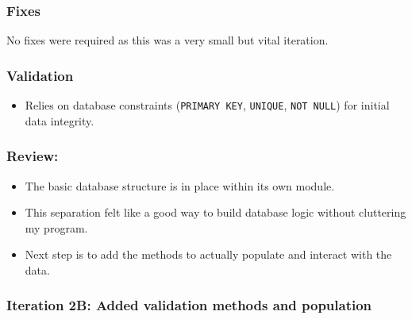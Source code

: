 \subsubsection{Fixes}
No fixes were required as this was a very small but vital iteration.

\subsubsection{Validation}
\begin{itemize}
	\item Relies on database constraints (\verb|PRIMARY KEY|, \verb|UNIQUE|, \verb|NOT NULL|) for initial data integrity.
\end{itemize}

\subsubsection{Review:}
\begin{itemize}
	\item The basic database structure is in place within its own module.
	\item This separation felt like a good way to build database logic without cluttering my program.
	\item Next step is to add the methods to actually populate and interact with the data.
\end{itemize}

\newpage

\subsubsection{Iteration 2B: Added validation methods and population}

